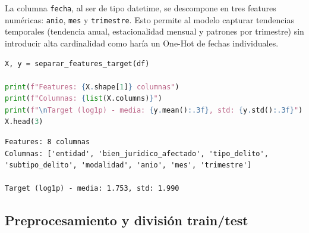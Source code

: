 La columna \texttt{fecha}, al ser de tipo datetime, se descompone en tres features numéricas: \texttt{anio}, \texttt{mes} y
\texttt{trimestre}. Esto permite al modelo capturar tendencias temporales (tendencia anual, estacionalidad mensual
y patrones por trimestre) sin introducir alta cardinalidad como haría un One-Hot de fechas individuales.

\begin{lstlisting}[language=Python, caption={Separación de features y target con transformación log1p}, label={lst:features-target}]
X, y = separar_features_target(df)

print(f"Features: {X.shape[1]} columnas")
print(f"Columnas: {list(X.columns)}")
print(f"\nTarget (log1p) - media: {y.mean():.3f}, std: {y.std():.3f}")
X.head(3)
\end{lstlisting}

\begin{lstlisting}
Features: 8 columnas
Columnas: ['entidad', 'bien_juridico_afectado', 'tipo_delito', 'subtipo_delito', 'modalidad', 'anio', 'mes', 'trimestre']

Target (log1p) - media: 1.753, std: 1.990
\end{lstlisting}

\begin{table}[ht]
  \centering
  \caption{Primeras filas de las features (X) y el target transformado (y)}
  \label{tab:features-target}
\end{table}


\subsection{Preprocesamiento y división train/test}


